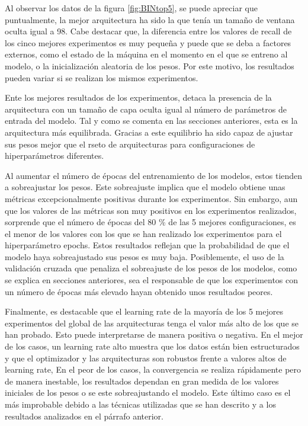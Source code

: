 Al observar los datos de la figura \ref{fig:BINtop5}, se puede apreciar que puntualmente, la mejor arquitectura ha sido la que tenía un tamaño de ventana oculta igual a 98. Cabe destacar que, la diferencia entre los valores de recall de los cinco mejores experimentos es muy pequeña y puede que se deba a factores externos, como el estado de la máquina en el momento en el que se entreno al modelo, o la inicialización aleatoria de los pesos. Por este motivo, los resultados pueden variar si se realizan los mismos experimentos.

Ente los mejores resultados de los experimentos, detaca la presencia de la arquitectura con un tamaño de capa oculta igual al número de parámetros de entrada del modelo. Tal y como se comenta en las secciones anteriores, esta es la arquitectura más equilibrada. Gracias a este equilibrio ha sido capaz de ajustar sus pesos mejor que el rseto de arquitecturas para configuraciones de hiperparámetros diferentes.

Al aumentar el número de épocas del entrenamiento de los modelos, estos tienden a sobreajustar los pesos. Este sobreajuste implica que el modelo obtiene unas métricas excepcionalmente positivas durante los experimentos. Sin embargo, aun que los valores de las métricas son muy positivos en los experimentos realizados, sorprende que el número de épocas del 80 \% de las 5 mejores configuraciones, es el menor de los valores con los que se han realizado los experimentos para el hiperparámetro epochs. Estos resultados reflejan que la probabilidad de que el modelo haya sobreajustado sus pesos es muy baja. Posiblemente, el uso de la validación cruzada que penaliza el sobreajuste de los pesos de los modelos, como se explica en secciones anteriores, sea el responsable de que los experimentos con un número de épocas más elevado hayan obtenido unos resultados peores.

Finalmente, es destacable que el learning rate de la mayoría de los 5 mejores experimentos del global de las arquitecturas tenga el valor más alto de los que se han probado. Esto puede interpretarse de manera positiva o negativa.
En el mejor de los casos, un learning rate alto muestra que los datos están bien estructurados y que el optimizador y las arquitecturas son robustos frente a valores altos de learning rate,
En el peor de los casos, la convergencia se realiza rápidamente pero de manera inestable, los resultados dependan en gran medida de los valores iniciales de los pesos o se este sobreajustando el modelo. Este último caso es el más improbable debido a las técnicas utilizadas que se han descrito y a los resultados analizados en el párrafo anterior.

